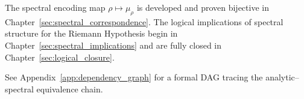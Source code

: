 \medskip

\noindent
The spectral encoding map \( \rho \mapsto \mu_\rho \) is developed and proven bijective in Chapter~\ref{sec:spectral_correspondence}. The logical implications of spectral structure for the Riemann Hypothesis begin in Chapter~\ref{sec:spectral_implications} and are fully closed in Chapter~\ref{sec:logical_closure}.

\medskip

\noindent
See Appendix~\ref{app:dependency_graph} for a formal DAG tracing the analytic–spectral equivalence chain.
